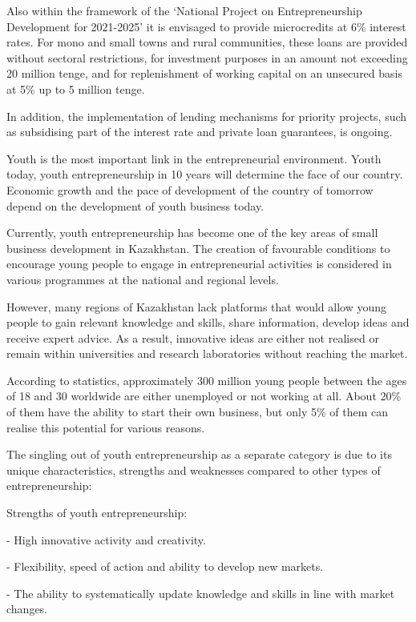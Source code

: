 \begin{multicols}{2}
Also within the framework of the `National Project on Entrepreneurship
Development for 2021-2025' it is envisaged to provide microcredits at
6\% interest rates. For mono and small towns and rural communities,
these loans are provided without sectoral restrictions, for investment
purposes in an amount not exceeding 20 million tenge, and for
replenishment of working capital on an unsecured basis at 5\% up to 5
million tenge.

In addition, the implementation of lending mechanisms for priority
projects, such as subsidising part of the interest rate and private loan
guarantees, is ongoing.

Youth is the most important link in the entrepreneurial environment.
Youth today, youth entrepreneurship in 10 years will determine the face
of our country. Economic growth and the pace of development of the
country of tomorrow depend on the development of youth business today.

Currently, youth entrepreneurship has become one of the key areas of
small business development in Kazakhstan. The creation of favourable
conditions to encourage young people to engage in entrepreneurial
activities is considered in various programmes at the national and
regional levels.

However, many regions of Kazakhstan lack platforms that would allow
young people to gain relevant knowledge and skills, share information,
develop ideas and receive expert advice. As a result, innovative ideas
are either not realised or remain within universities and research
laboratories without reaching the market.

According to statistics, approximately 300 million young people between
the ages of 18 and 30 worldwide are either unemployed or not working at
all. About 20\% of them have the ability to start their own business,
but only 5\% of them can realise this potential for various reasons.

The singling out of youth entrepreneurship as a separate category is due
to its unique characteristics, strengths and weaknesses compared to
other types of entrepreneurship:

Strengths of youth entrepreneurship:

- High innovative activity and creativity.

- Flexibility, speed of action and ability to develop new markets.

- The ability to systematically update knowledge and skills in line with
market changes.


\end{multicols}
